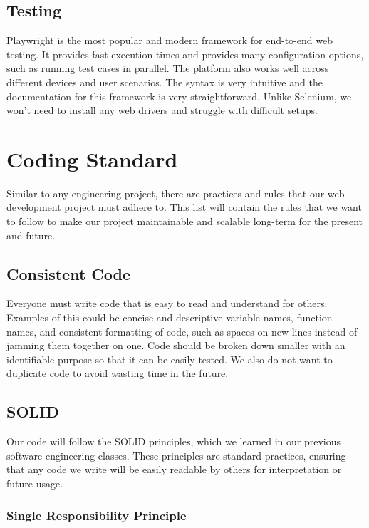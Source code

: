 \documentclass{article}
\begin{document}
\subsection*{Testing}

Playwright is the most popular and modern framework for end-to-end web testing. It provides fast execution times and provides many configuration options, such as running test cases in parallel. The platform also works well across different devices and user scenarios. The syntax is very intuitive and the documentation for this framework is very straightforward. Unlike Selenium, we won't need to install any web drivers and struggle with difficult setups.

\section{Coding Standard}

Similar to any engineering project, there are practices and rules that our web development project must adhere to. This list will contain the rules that we want to follow to make our project maintainable and scalable long-term for the present and future.

\subsection*{Consistent Code}

Everyone must write code that is easy to read and understand for others. Examples of this could be concise and descriptive variable names, function names, and consistent formatting of code, such as spaces on new lines instead of jamming them together on one. Code should be broken down smaller with an identifiable purpose so that it can be easily tested. We also do not want to duplicate code to avoid wasting time in the future.

\subsection*{SOLID}

Our code will follow the SOLID principles, which we learned in our previous software engineering classes. These principles are standard practices, ensuring that any code we write will be easily readable by others for interpretation or future usage.

\subsubsection*{Single Responsibility Principle}
\end{document}
